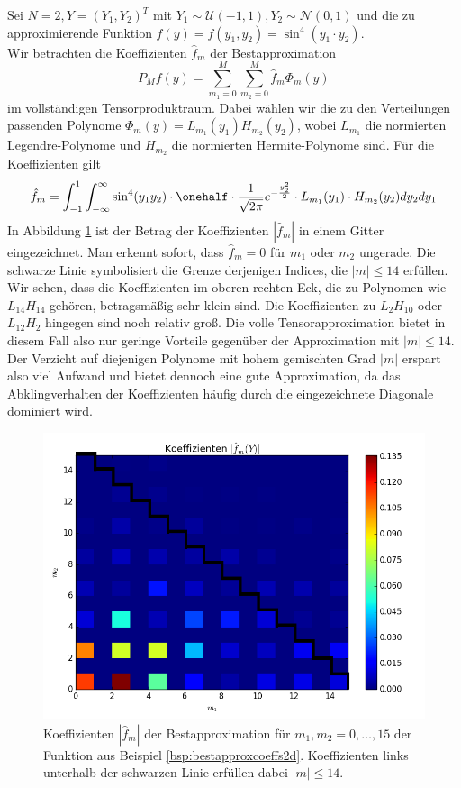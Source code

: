 \begin{mathbsp}
\label{bsp:bestapproxcoeffs2d}
Sei $N=2, Y=(Y_1,Y_2)^T$ mit $Y_1\sim \mathcal{U}(-1,1), Y_2\sim\mathcal{N}(0,1)$ und die zu approximierende Funktion $f(y)=f(y_1,y_2)=\sin^4(y_1\cdot y_2)$.\\
Wir betrachten die Koeffizienten $\hat{f}_m$ der Bestapproximation \[P_Mf(y)=\sum_{m_1=0}^M\sum_{m_2=0}^M\hat{f}_m\Phi_m(y)\] im vollständigen Tensorproduktraum. Dabei wählen wir die zu den Verteilungen passenden Polynome $\Phi_m(y)=L_{m_1}(y_1)H_{m_2}(y_2)$, wobei $L_{m_1}$ die normierten Legendre-Polynome und $H_{m_2}$ die normierten Hermite-Polynome sind. Für die Koeffizienten gilt
\[\hat{f}_m=\int_{-1}^1\int_{-\infty}^\infty \sin^4(y_1y_2)\cdot \onehalf \cdot \frac{1}{\sqrt{2\pi}}e^{-\frac{y_2^2}{2}}\cdot L_{m_1}(y_1)\cdot H_{m_2}(y_2)dy_2dy_1\]
In Abbildung \ref{fig:bestapproxcoeffs2d} ist der Betrag der Koeffizienten $|\hat{f}_m|$ in einem Gitter eingezeichnet. Man erkennt sofort, dass $\hat{f}_m=0$ für $m_1$ oder $m_2$ ungerade. Die schwarze Linie symbolisiert die Grenze derjenigen Indices, die $|m|\le 14$ erfüllen. Wir sehen, dass die Koeffizienten im oberen rechten Eck, die zu Polynomen wie $L_{14}H_{14}$ gehören, betragsmäßig sehr klein sind. Die Koeffizienten zu $L_{2}H_{10}$ oder $L_{12}H_{2}$ hingegen sind noch relativ groß. Die volle Tensorapproximation bietet in diesem Fall also nur geringe Vorteile gegenüber der Approximation mit $|m|\le 14$. Der Verzicht auf diejenigen Polynome mit hohem gemischten Grad $|m|$ erspart also viel Aufwand und bietet dennoch eine gute Approximation, da das Abklingverhalten der Koeffizienten häufig durch die eingezeichnete Diagonale dominiert wird.
\begin{figure}[!htb]
\includegraphics[width=\textwidth]{Figures/best_approx_coeffs_2d.png}
\caption{Koeffizienten $|\hat{f}_m|$ der Bestapproximation für $m_1,m_2=0,\dots,15$ der Funktion aus Beispiel \ref{bsp:bestapproxcoeffs2d}. Koeffizienten links unterhalb der schwarzen Linie erfüllen dabei $|m|\le 14$.}
\label{fig:bestapproxcoeffs2d}
\end{figure}
\end{mathbsp}
